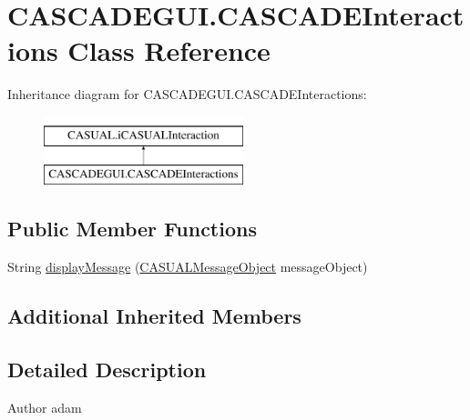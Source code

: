 \hypertarget{classCASCADEGUI_1_1CASCADEInteractions}{\section{C\-A\-S\-C\-A\-D\-E\-G\-U\-I.\-C\-A\-S\-C\-A\-D\-E\-Interactions Class Reference}
\label{classCASCADEGUI_1_1CASCADEInteractions}
}
Inheritance diagram for C\-A\-S\-C\-A\-D\-E\-G\-U\-I.\-C\-A\-S\-C\-A\-D\-E\-Interactions\-:\begin{figure}[H]
\begin{center}
\leavevmode
\includegraphics[height=2.000000cm]{classCASCADEGUI_1_1CASCADEInteractions}
\end{center}
\end{figure}
\subsection*{Public Member Functions}
\begin{DoxyCompactItemize}
\item 
String \hyperlink{classCASCADEGUI_1_1CASCADEInteractions_a4a7a501373e72563b00ba7ef6b4b6ecb}{display\-Message} (\hyperlink{classCASUAL_1_1CASUALMessageObject}{C\-A\-S\-U\-A\-L\-Message\-Object} message\-Object)
\end{DoxyCompactItemize}
\subsection*{Additional Inherited Members}


\subsection{Detailed Description}
\begin{DoxyAuthor}{Author}
adam 
\end{DoxyAuthor}


